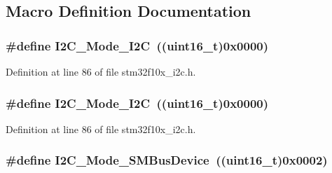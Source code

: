 \subsection{Macro Definition Documentation}
\subsubsection[{\texorpdfstring{I2\+C\+\_\+\+Mode\+\_\+\+I2C}{I2C_Mode_I2C}}]{\setlength{\rightskip}{0pt plus 5cm}\#define I2\+C\+\_\+\+Mode\+\_\+\+I2C~(({\bf uint16\+\_\+t})0x0000)}\hypertarget{group___i2_c__mode_ga8bc3b0555ca31b6f8423bc2ada45d1ac}{}\label{group___i2_c__mode_ga8bc3b0555ca31b6f8423bc2ada45d1ac}


Definition at line 86 of file stm32f10x\+\_\+i2c.\+h.

\subsubsection[{\texorpdfstring{I2\+C\+\_\+\+Mode\+\_\+\+I2C}{I2C_Mode_I2C}}]{\setlength{\rightskip}{0pt plus 5cm}\#define I2\+C\+\_\+\+Mode\+\_\+\+I2C~(({\bf uint16\+\_\+t})0x0000)}\hypertarget{group___i2_c__mode_ga8bc3b0555ca31b6f8423bc2ada45d1ac}{}\label{group___i2_c__mode_ga8bc3b0555ca31b6f8423bc2ada45d1ac}


Definition at line 86 of file stm32f10x\+\_\+i2c.\+h.

\subsubsection[{\texorpdfstring{I2\+C\+\_\+\+Mode\+\_\+\+S\+M\+Bus\+Device}{I2C_Mode_SMBusDevice}}]{\setlength{\rightskip}{0pt plus 5cm}\#define I2\+C\+\_\+\+Mode\+\_\+\+S\+M\+Bus\+Device~(({\bf uint16\+\_\+t})0x0002)}\hypertarget{group___i2_c__mode_gaf0cf66bc1f4986ba8a9925da924e06da}{}\label{group___i2_c__mode_gaf0cf66bc1f4986ba8a9925da924e06da}



